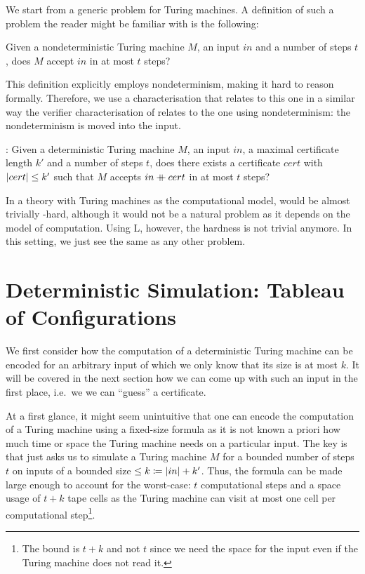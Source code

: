 We start from a generic problem for Turing machines. A definition of such a problem the reader might be familiar with is the following:
\begin{center}
  Given a nondeterministic Turing machine $M$, an input $in$ and a number of steps $t$, does $M$ accept $in$ in at most $t$ steps?
\end{center}
This definition explicitly employs nondeterminism, making it hard to reason formally. Therefore, we use a characterisation that relates to this one in a similar way the verifier characterisation of \NP{} relates to the one using nondeterminism: the nondeterminism is moved into the input.
\begin{center}
  \gennp{}:
  Given a deterministic Turing machine $M$, an input $in$, a maximal certificate length $k'$ and a number of steps $t$, does there exists a certificate $cert$ with $|cert| \le k'$ such that $M$ accepts $in \mathbin{+\mkern-10mu+} cert$ in at most $t$ steps?
\end{center}

In a theory with Turing machines as the computational model, \gennp{} would be almost trivially \NP{}-hard, although it would not be a natural problem as it depends on the model of computation.
Using L, however, the hardness is not trivial anymore. In this setting, we just see \gennp{} the same as any other problem.

\section{Deterministic Simulation: Tableau of Configurations}
We first consider how the computation of a deterministic Turing machine can be encoded for an arbitrary input of which we only know that its size is at most $k$. 
It will be covered in the next section how we can come up with such an input in the first place, i.e.\ we we can ``guess'' a certificate.

At a first glance, it might seem unintuitive that one can encode the computation of a Turing machine using a fixed-size formula as it is not known a priori how much time or space the Turing machine needs on a particular input.
The key is that \gennp{} just asks us to simulate a Turing machine $M$ for a bounded number of steps $t$ on inputs of a bounded size $\le k \coloneqq |in| + k'$. 
Thus, the formula can be made large enough to account for the worst-case: $t$ computational steps and a space usage of $t + k$ tape cells as the Turing machine can visit at most one cell per computational step\footnote{The bound is $t +k$ and not $t$ since we need the space for the input even if the Turing machine does not read it.}. 

